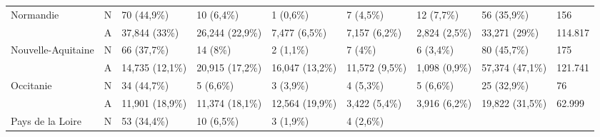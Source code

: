 \begin{table}[H]
{\begin{tabular}{|l|l|l|l|l|l|l|l|l|}
            Normandie                                         & N               & 70 (44,9\%)                                 & 10 (6,4\%)      & 1 (0,6\%)        & 7 (4,5\%)      & 12
            (7,7\%)                                           & 56 (35,9\%)     & 156                                                                                                                    \\
            ~                                                 & A               & 37,844 (33\%)                               & 26,244 (22,9\%) & 7,477 (6,5\%)    & 7,157 (6,2\%)
                                                              & 2,824 (2,5\%)   & 33,271 (29\%)                               & 114.817                                                                  \\ \hline
            Nouvelle-Aquitaine                                & N               & 66 (37,7\%)                                 & 14 (8\%)        & 2 (1,1\%)        & 7 (4\%)        &
            6 (3,4\%)                                         & 80 (45,7\%)     & 175                                                                                                                    \\
            ~                                                 & A               & 14,735 (12,1\%)                             & 20,915 (17,2\%) & 16,047 (13,2\%)  & 11,572
            (9,5\%)                                           & 1,098 (0,9\%)   & 57,374 (47,1\%)                             & 121.741                                                                  \\ \hline
            Occitanie                                         & N               & 34 (44,7\%)                                 & 5 (6,6\%)       & 3 (3,9\%)        & 4 (5,3\%)      & 5
            (6,6\%)                                           & 25 (32,9\%)     & 76                                                                                                                     \\
            ~                                                 & A               & 11,901 (18,9\%)                             & 11,374 (18,1\%) & 12,564 (19,9\%)  & 3,422
            (5,4\%)                                           & 3,916 (6,2\%)   & 19,822 (31,5\%)                             & 62.999                                                                   \\ \hline
            Pays de la Loire                                  & N               & 53 (34,4\%)                                 & 10 (6,5\%)      & 3 (1,9\%)        & 4 (2,6\%)

\end{tabular}}
\end{table}
